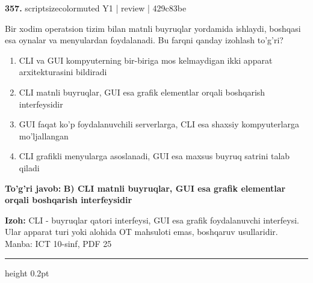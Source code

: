 \documentclass[10pt,a4paper]{article}
\begin{document}
{\bfseries\sffamily\color{ink} 357.} {scriptsizecolor{muted} Y1 | review | 429c83be}
\par
Bir xodim operatsion tizim bilan matnli buyruqlar yordamida ishlaydi, boshqasi esa oynalar va menyulardan foydalanadi. Bu farqni qanday izohlash to'g'ri?
\begin{enumerate}[label=\Alph*),leftmargin=9mm]
\item CLI va GUI kompyuterning bir-biriga mos kelmaydigan ikki apparat arxitekturasini bildiradi
\item CLI matnli buyruqlar, GUI esa grafik elementlar orqali boshqarish interfeysidir
\item GUI faqat ko'p foydalanuvchili serverlarga, CLI esa shaxsiy kompyuterlarga mo'ljallangan
\item CLI grafikli menyularga asoslanadi, GUI esa maxsus buyruq satrini talab qiladi
\end{enumerate}
\begin{tcolorbox}[enhanced,breakable,colback=teal!4,colframe=teal!60!black,boxrule=0.45pt,arc=1.2mm,left=2.7mm,right=2.7mm,top=1.8mm,bottom=1.8mm,before skip=2mm,after skip=2mm]
{\bfseries\sffamily\color{teal}To'g'ri javob:} \textbf{B) CLI matnli buyruqlar, GUI esa grafik elementlar orqali boshqarish interfeysidir}
\par\smallskip
{\bfseries Izoh:} CLI - buyruqlar qatori interfeysi, GUI esa grafik foydalanuvchi interfeysi. Ular apparat turi yoki alohida OT mahsuloti emas, boshqaruv usullaridir. Manba: ICT 10-sinf, PDF 25
\end{tcolorbox}
\vspace{2mm}\hrule height 0.2pt\vspace{3mm}
\end{document}
